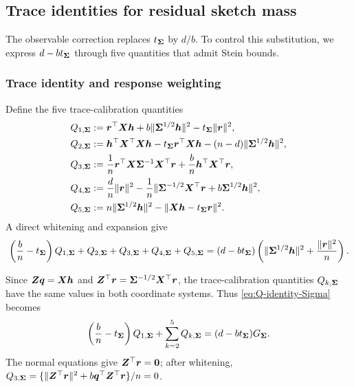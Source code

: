 \documentclass{article}
\theoremstyle{plain} %
\theoremstyle{definition} %
\theoremstyle{definition} %
\begin{document}
\subsection{Trace identities for residual sketch mass}

The observable correction replaces $t_{\boldsymbol{\Sigma}}$ by $d/b$. To control
this substitution, we express $d-bt_{\boldsymbol{\Sigma}}$ through five quantities
that admit Stein bounds.

\subsubsection{Trace identity and response weighting}

Define the five trace-calibration quantities
\begin{align*}
    Q_{1,\boldsymbol{\Sigma}}
    &:= \boldsymbol{r}^\top\boldsymbol{X}\boldsymbol{h}
    +b\lVert\boldsymbol{\Sigma}^{1/2}\boldsymbol{h}\rVert^2
    -t_{\boldsymbol{\Sigma}}\lVert\boldsymbol{r}\rVert^2,\\
    Q_{2,\boldsymbol{\Sigma}}
    &:= \boldsymbol{h}^\top\boldsymbol{X}^\top\boldsymbol{X}\boldsymbol{h}
    -t_{\boldsymbol{\Sigma}}\boldsymbol{r}^\top\boldsymbol{X}\boldsymbol{h}
    -(n-d)\lVert\boldsymbol{\Sigma}^{1/2}\boldsymbol{h}\rVert^2,\\
    Q_{3,\boldsymbol{\Sigma}}
    &:= \frac{1}{n}\boldsymbol{r}^\top\boldsymbol{X}\boldsymbol{\Sigma}^{-1}\boldsymbol{X}^\top\boldsymbol{r}
    +\frac{b}{n}\boldsymbol{h}^\top\boldsymbol{X}^\top\boldsymbol{r},\\
    Q_{4,\boldsymbol{\Sigma}}
    &:= \frac{d}{n}\lVert\boldsymbol{r}\rVert^2
    -\frac{1}{n}\lVert
        \boldsymbol{\Sigma}^{-1/2}\boldsymbol{X}^\top\boldsymbol{r}+b\boldsymbol{\Sigma}^{1/2}\boldsymbol{h}
    \rVert^2,\\
    Q_{5,\boldsymbol{\Sigma}}
    &:= n\lVert\boldsymbol{\Sigma}^{1/2}\boldsymbol{h}\rVert^2
    -\lVert\boldsymbol{X}\boldsymbol{h}-t_{\boldsymbol{\Sigma}}\boldsymbol{r}\rVert^2.
\end{align*}
A direct whitening and expansion give
\begin{align}
    \left(\frac{b}{n}-t_{\boldsymbol{\Sigma}}\right)Q_{1,\boldsymbol{\Sigma}}
    +Q_{2,\boldsymbol{\Sigma}}+Q_{3,\boldsymbol{\Sigma}}
    +Q_{4,\boldsymbol{\Sigma}}+Q_{5,\boldsymbol{\Sigma}}
    =
    (d-bt_{\boldsymbol{\Sigma}})
    \left(
        \lVert\boldsymbol{\Sigma}^{1/2}\boldsymbol{h}\rVert^2
        +\frac{\lVert\boldsymbol{r}\rVert^2}{n}
    \right).
    \label{eq:Q-identity-Sigma}
\end{align}

Since $\boldsymbol{Z}\boldsymbol{q}=\boldsymbol{X}\boldsymbol{h}$ and
$\boldsymbol{Z}^\top\boldsymbol{r}=\boldsymbol{\Sigma}^{-1/2}\boldsymbol{X}^\top\boldsymbol{r}$, the trace-calibration quantities
$Q_{k,\boldsymbol{\Sigma}}$ have the same values in both coordinate systems.  Thus
\eqref{eq:Q-identity-Sigma} becomes
\begin{align}
    \left(\frac bn-t_{\boldsymbol{\Sigma}}\right)Q_{1,\boldsymbol{\Sigma}}
    +\sum_{k=2}^5Q_{k,\boldsymbol{\Sigma}}
    =(d-bt_{\boldsymbol{\Sigma}})G_{\boldsymbol{\Sigma}}.
    \label{eq:Q-identity-isotropic}
\end{align}
The normal equations give $\boldsymbol{Z}^\top\boldsymbol{r}=\mathbf{0}$; after whitening,
$Q_{3,\boldsymbol{\Sigma}}
=\{\lVert\boldsymbol{Z}^\top\boldsymbol{r}\rVert^2+b\boldsymbol{q}^\top\boldsymbol{Z}^\top\boldsymbol{r}\}/n=0$.
\end{document}
